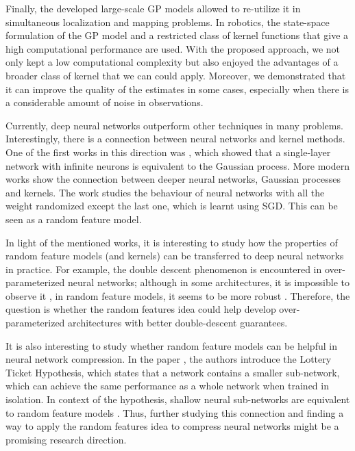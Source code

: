 Finally, the developed large-scale GP models allowed to re-utilize it
in simultaneous localization and mapping problems.
In robotics, the state-space formulation of the GP model and a restricted
class of kernel functions that give a high computational performance are used.
With the proposed approach, we not only kept a low computational complexity
but also enjoyed the advantages of a broader class of kernel that we can could apply.
Moreover, we demonstrated that it can improve the quality of the estimates in some cases,
especially when there is a considerable amount of noise in observations.






Currently, deep neural networks outperform other techniques in many
problems.
Interestingly, there is a connection between neural networks
and kernel methods.
One of the first works in this direction was \citep{williams1996computing}, which
showed that a single-layer network with infinite neurons is equivalent
to the Gaussian process.
More modern works \citep{lee2017deep,jacot2018neural} show the connection
between deeper neural networks, Gaussian processes and kernels.
The work \citep{daniely2017sgd} studies the behaviour of
neural networks with all the weight randomized except the last one, which
is learnt using SGD.
This can be seen as a random feature model.

In light of the mentioned works, it is interesting to study how the properties
of random feature models (and kernels) can be transferred
to deep neural networks in practice.
For example, the double descent phenomenon is encountered in over-parameterized
neural networks;
although in some architectures, it is impossible to observe it \citep{ba2019generalization},
in random feature models, it seems to be more robust \citep{mei2019generalization}.
Therefore, the question is whether the random features idea could help develop
over-parameterized architectures with better double-descent guarantees.

It is also interesting to study whether random feature models can be helpful
in neural network compression.
In the paper \citep{frankle2018lottery}, the authors introduce the Lottery Ticket Hypothesis,
which states that a network contains a smaller sub-network, which can achieve
the same performance as a whole network when trained in isolation.
In context of the hypothesis, shallow neural sub-networks are equivalent
to random feature models \citep{malach2020proving}.
Thus, further studying this connection and finding a way to apply
the random features idea to compress neural networks might be a promising
research direction.

